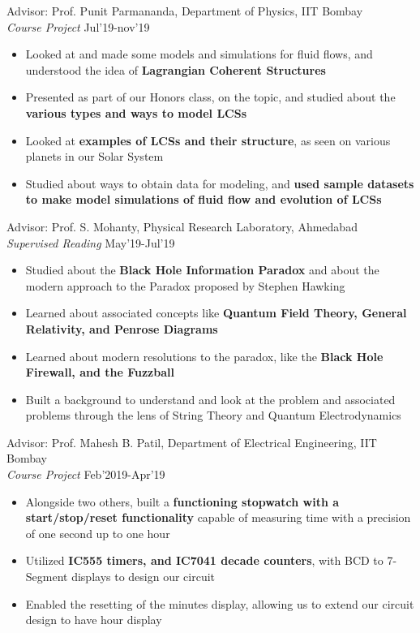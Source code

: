 

{
    Advisor: Prof. Punit Parmananda, Department of Physics,
    IIT Bombay \\
    \emph{Course Project}
}
{
    Jul'19-nov'19
}
{
    \begin{itemize}
    \item Looked at and made some models and simulations   for fluid flows, and understood the idea of \textbf{Lagrangian Coherent Structures}
    \item Presented as part of our Honors class, on the topic, and studied about the \textbf{various types and ways to model LCSs}
    \item Looked at \textbf{examples of LCSs and their structure}, as seen on various planets in our Solar System
    \item Studied about ways to obtain data for modeling, and \textbf{used sample datasets to make model simulations of fluid flow and evolution of LCSs}
    \end{itemize}
}

{
    Advisor: Prof. S. Mohanty, Physical Research Laboratory, Ahmedabad \\
    \emph{Supervised Reading}
}
{
    May'19-Jul'19
}
{
    \begin{itemize}
        \item Studied about the \textbf{Black Hole Information Paradox} and about the modern approach to the Paradox proposed by Stephen Hawking
        \item Learned about associated concepts like \textbf{Quantum Field Theory, General Relativity, and Penrose Diagrams}
        \item Learned about modern resolutions to the paradox, like the \textbf{Black Hole Firewall, and the Fuzzball}
        \item Built a background to understand and look at the problem and associated problems through the lens of String Theory and Quantum Electrodynamics
    \end{itemize}
}

{
    Advisor: Prof. Mahesh B. Patil, Department of Electrical Engineering, IIT Bombay \\
    \emph{Course Project}
}
{
    Feb'2019-Apr'19
}
{
    \begin{itemize}
        \item Alongside two others, built a \textbf{functioning stopwatch with a start/stop/reset functionality} capable of measuring time with a precision of one second up to one hour
        \item Utilized \textbf{IC555 timers, and IC7041 decade counters}, with BCD to 7-Segment displays to design our circuit
        \item Enabled the resetting of the minutes display, allowing us to extend our circuit design to have hour display
    \end{itemize}
}
